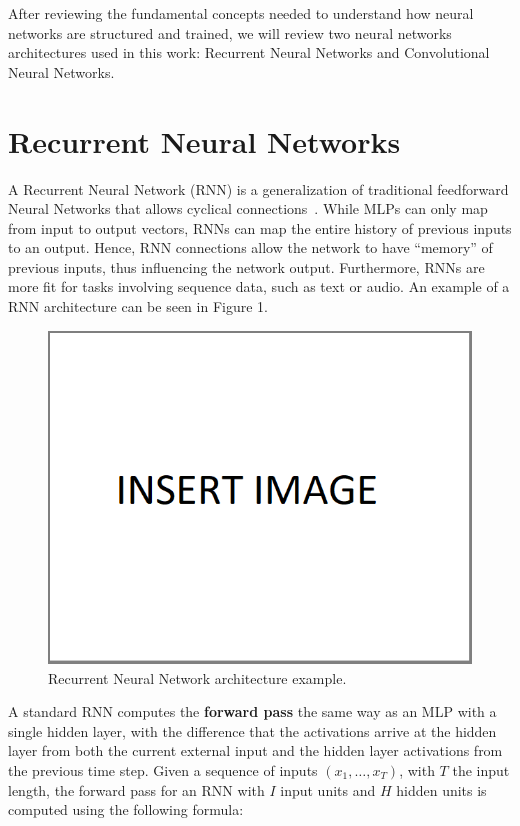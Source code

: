 After reviewing the fundamental concepts needed to understand how neural networks are 
structured and trained, we will review two neural networks architectures used in this work: 
Recurrent Neural Networks and Convolutional Neural Networks.

\section{Recurrent Neural Networks}
\label{appendix:recurrentNN}
A Recurrent Neural Network (RNN) is a generalization of traditional feedforward Neural 
Networks that allows cyclical connections~\cite{seqlab:Graves2012-385}. While MLPs can only 
map from input to output vectors, RNNs can map the entire history of previous inputs to an 
output. Hence, RNN connections allow the network to have “memory” of previous inputs, thus 
influencing the network output. Furthermore, RNNs are more fit for tasks involving sequence 
data, such as text or audio. An example of a RNN architecture can be seen in Figure 1.

\begin{figure}[!h]
    \centering
    \includegraphics[scale=.45]{imagenes/insertImage.png}
    \caption{Recurrent Neural Network architecture example.}
    \label{fig:recurrentNN}
\end{figure}

A standard RNN computes the \textbf{forward pass} the same way as an MLP with a single hidden 
layer, with the difference that the activations arrive at the hidden layer from both the 
current external input and the hidden layer activations from the previous time step. Given a 
sequence of inputs $(x_1,\ldots,x_T)$, with $T$ the input length, the forward pass for an RNN 
with $I$ input units and $H$ hidden units is computed using the following formula:

